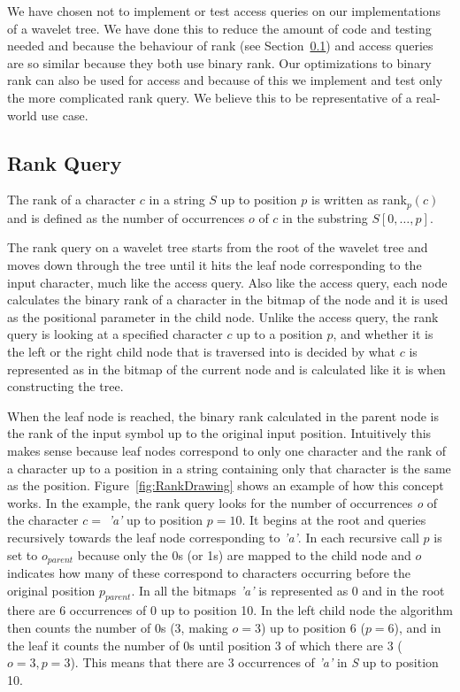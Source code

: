 We have chosen not to implement or test access queries on our implementations of a wavelet tree.
We have done this to reduce the amount of code and testing needed and because the behaviour of rank (see Section~\ref{sec:rankDescription}) and access queries are so similar because they both use binary rank. 
Our optimizations to binary rank can also be used for access and because of this we implement and test only the more complicated rank query.
We believe this to be representative of a real-world use case.

\subsection{Rank Query}
\label{sec:rankDescription}
The rank of a character $c$ in a string $S$ up to position $p$ is written as rank$_{p}(c)$ and is defined as the number of occurrences $o$ of $c$ in the substring $S[0, \ldots, p]$.

The rank query on a wavelet tree starts from the root of the wavelet tree and moves down through the tree until it hits the leaf node corresponding to the input character, much like the access query.
Also like the access query, each node calculates the binary rank of a character in the bitmap of the node and it is used as the positional parameter in the child node.
Unlike the access query, the rank query is looking at a specified character $c$ up to a position $p$, and whether it is the left or the right child node that is traversed into is decided by what $c$ is represented as in the bitmap of the current node and is calculated like it is when constructing the tree.

When the leaf node is reached, the binary rank calculated in the parent node is the rank of the input symbol up to the original input position.
Intuitively this makes sense because leaf nodes correspond to only one character and the rank of a character up to a position in a string containing only that character is the same as the position.
Figure~\ref{fig:RankDrawing} shows an example of how this concept works.
In the example, the rank query looks for the number of occurrences \textit{o} of the character $c = $ \textit{'a'} up to position $p = 10$.
It begins at the root and queries recursively towards the leaf node corresponding to \textit{'a'}. 
In each recursive call $p$ is set to $o_{parent}$ because only the 0s (or 1s) are mapped to the child node and $o$ indicates how many of these correspond to characters occurring before the original position $p_{parent}$.
In all the bitmaps \textit{'a'} is represented as 0 and in the root there are 6 occurrences of 0 up to position 10. 
In the left child node the algorithm then counts the number of 0s (3, making $o=3$) up to position 6 ($p=6$), and in the leaf it counts the number of 0s until position 3 of which there are 3 ($o=3, p=3$). 
This means that there are 3 occurrences of \textit{'a'} in \textit{S} up to position 10.

